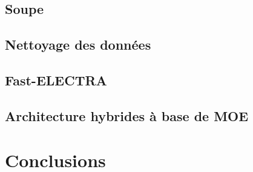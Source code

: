 \documentclass[12pt,twoside,maitrise]{dms}
\theoremstyle{definition}
\numberwithin{equation}{section}
\numberwithin{table}{chapter}
\numberwithin{figure}{chapter}
\begin{document}
\section{Soupe}
\section{Nettoyage des données}
\section{Fast-ELECTRA}
\section{Architecture hybrides à base de MOE}
\chapter{Conclusions}




\def\bibname{R\'ef\'erences} %

\end{document}

